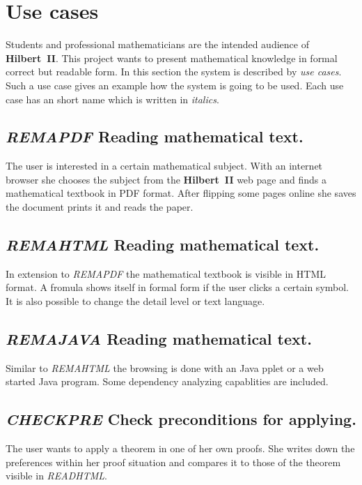 \documentclass[a4paper,german,10pt,twoside]{book}
\theoremstyle{definition}
\theoremstyle{remark}
\begin{document}
\section{Use cases} \label{chapter3_section1} \hypertarget{chapter3_section1}{}
Students and professional mathematicians are the intended audience of \textbf{Hilbert~II}. This project wants to present mathematical knowledge in formal correct but readable form. In this section the system is described by \emph{use cases}. Such a use case gives an example how the system is going to be used. Each use case has an short name which is written in \emph{italics}.

\subsection{\emph{REMAPDF} Reading mathematical text.
}
The user is interested in a certain mathematical subject. With an internet browser she chooses the subject from the \textbf{Hilbert~II} web page and finds a mathematical textbook in PDF format. After flipping some pages online she saves the document prints it and reads the paper.


\subsection{\emph{REMAHTML} Reading mathematical text.
}
In extension to \emph{REMAPDF} the mathematical textbook is visible in HTML format. A fromula shows itself in formal form if the user clicks a certain symbol. It is also possible to change the detail level or text language.


\subsection{\emph{REMAJAVA} Reading mathematical text.
}
Similar to \emph{REMAHTML} the browsing is done with an Java pplet or a web started Java program. Some dependency analyzing capablities are included.


\subsection{\emph{CHECKPRE} Check preconditions for applying.
}
The user wants to apply a theorem in one of her own proofs. She writes down the preferences within her proof situation and compares it to those of the theorem visible in \emph{READHTML}.
\end{document}
